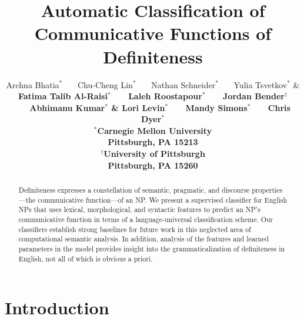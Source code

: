 \documentclass[11pt,letterpaper]{article}
\title{Automatic Classification of Communicative Functions of Definiteness}
\author{Archna Bhatia$^\ast$ \ \ \ Chu-Cheng Lin$^\ast$ \ \ \ Nathan Schneider$^\ast$ \ \ \ Yulia Tsvetkov$^\ast$ & \bf Fatima Talib Al-Raisi$^\ast$ \ \ \  Laleh Roostapour$^\ast$ \ \ \ Jordan Bender$^\dagger$  \ \ \ Abhimanu Kumar$^\ast$  & \bf Lori Levin$^\ast$ \ \ \ Mandy Simons$^\ast$ \ \ \  Chris Dyer$^\ast$\\
$^\ast$Carnegie Mellon University\\
Pittsburgh, PA 15213\\
$^\dagger$University of Pittsburgh\\
Pittsburgh, PA 15260}
\date{}
\newcommand{\ensuretext}[1]{#1}
\newcommand{\abmarker}{\ensuretext{\textcolor{red}{\ensuremath{^{\textsc{A}}_{\textsc{B}}}}}}
\newcommand{\arkcomment}[3]{\ensuretext{\textcolor{#3}{[#1 #2]}}}
\newcommand{\ab}[1]{\arkcomment{\abmarker}{#1}{red}}
\begin{document}
\maketitle
\begin{abstract}
Definiteness expresses a constellation of semantic, pragmatic, and discourse properties---the communicative function---of an NP. We present a supervised classifier for English NPs that uses lexical, morphological, and syntactic features to predict an NP's communicative function in terms of a language-universal classification scheme. Our classifiers establish strong baselines for future work in this neglected area of computational semantic analysis. In addition, analysis of the features and learned parameters 
in the model provides insight into the grammaticalization of definiteness in English, 
not all of which is obvious a priori.
\end{abstract}

\section{Introduction}
\end{document}
